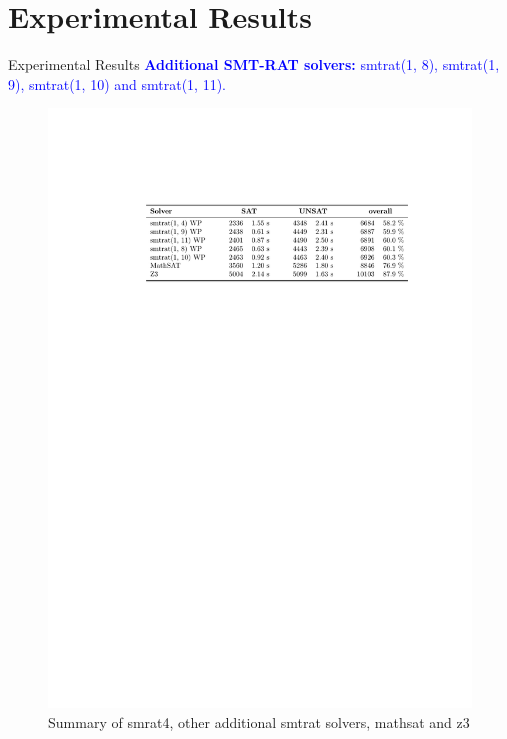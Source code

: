 \documentclass[]{beamer}
\begin{document}
\section{Experimental Results}
\begin{frame}{Experimental Results}
\textcolor{blue}{\textbf{Additional SMT-RAT solvers: }smtrat(1, 8), smtrat(1, 9), smtrat(1, 10) and smtrat(1, 11).}
\begin{figure}[!ht]
    \centering
    \caption{Summary of smrat4, other additional smtrat solvers, mathsat and z3}
    \includegraphics[width=1\linewidth]{../figures/summarySolvers.pdf}
\end{figure}
\end{frame}
\end{document}

